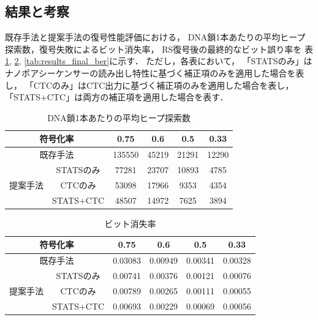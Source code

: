 \documentclass[sotsuron]{kuee}
\begin{document}
\subsection{結果と考察}
既存手法と提案手法の復号性能評価における，
DNA鎖1本あたりの平均ヒープ探索数，復号失敗によるビット消失率，
RS復号後の最終的なビット誤り率を
表\ref{tab:results_heap}, \ref{tab:results_deletion}, 
\ref{tab:results_final_ber}に示す．
ただし，各表において，
「STATSのみ」はナノポアシーケンサーの読み出し特性に基づく補正項のみを適用した場合を表し，
「CTCのみ」はCTC出力に基づく補正項のみを適用した場合を表し，
「STATS+CTC」は両方の補正項を適用した場合を表す．
\begin{table}
  \centering
  \caption{DNA鎖1本あたりの平均ヒープ探索数}
  \label{tab:results_heap}
  \begin{tabular}{c|c|cccc}
    \hline
    \multicolumn{2}{c|}{符号化率} & 0.75 & 0.6 & 0.5 & 0.33 \\
    \hline
    \multicolumn{2}{c|}{既存手法} & 135550 & 45219 & 21291 & 12290 \\
    \hline
    \multirow{3}{*}{提案手法} & STATSのみ & 77281 & 23707 & 10893 & 4785 \\
    \cline{2-6}
     & CTCのみ & 53098 & 17966 & 9353 & 4354 \\
    \cline{2-6}
     & STATS+CTC & 48507 & 14972 & 7625 & 3894 \\
    \hline
  \end{tabular}
\end{table}
\begin{table}
  \centering
  \caption{ビット消失率}
  \label{tab:results_deletion}
  \begin{tabular}{c|c|cccc}
    \hline
    \multicolumn{2}{c|}{符号化率} & 0.75 & 0.6 & 0.5 & 0.33 \\
    \hline
    \multicolumn{2}{c|}{既存手法} & 0.03083 & 0.00949 & 0.00341 & 0.00328 \\
    \hline
    \multirow{3}{*}{提案手法} & STATSのみ & 0.00741 & 0.00376 & 0.00121 & 0.00076 \\
    \cline{2-6}
     & CTCのみ & 0.00789 & 0.00265 & 0.00111 & 0.00055 \\
    \cline{2-6}
     & STATS+CTC & 0.00693 & 0.00229 & 0.00069 & 0.00056 \\
    \hline
  \end{tabular}
\end{table}
\end{document}

